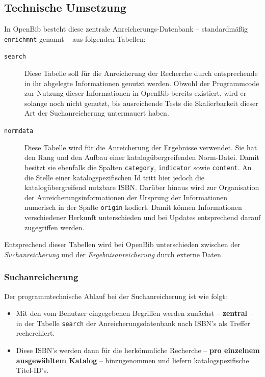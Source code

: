 \documentclass[11pt, twoside, a4paper, BCOR8mm, DIV12, bibtotoc,idxtotoc]{scrbook}
\begin{document}
\subsection{Technische Umsetzung}

In OpenBib besteht diese zentrale Anreicherungs-Datenbank --
standardmäßig \texttt{enrichmnt} genannt -- aus folgenden Tabellen:

\begin{description}
\item[\texttt{search}] Diese Tabelle soll für die Anreicherung der Recherche
  durch entsprechende in ihr abgelegte Informationen genutzt
  werden. Obwohl der Programmcode zur Nutzung dieser Informationen
  in OpenBib bereits existiert, wird er solange noch nicht genutzt,
  bis ausreichende Tests die Skalierbarkeit dieser Art der
  Suchanreicherung untermauert haben.

\item[\texttt{normdata}] Diese Tabelle wird für die Anreicherung der
  Ergebnisse verwendet. Sie hat den Rang und den Aufbau einer
  katalog\-übergreifenden Norm-Datei. Damit besitzt sie ebenfalls die
  Spalten \texttt{category}, \texttt{indicator} sowie
  \texttt{content}. An die Stelle einer katalog\-spezifischen Id tritt
  hier jedoch die katalogübergreifend nutzbare ISBN. Darüber hinaus
  wird zur Organisation der Anreicherungsinformationen der Ursprung
  der Informationen numerisch in der Spalte \texttt{origin}
  kodiert. Damit können Informationen verschiedener Herkunft
  unterschieden und bei Updates entsprechend darauf zugegriffen werden.   
\end{description}

Entsprechend dieser Tabellen wird bei OpenBib unterschieden zwischen
der \emph{Suchanreicherung} und der \emph{Ergebnisanreicherung}
durch externe Daten.

\subsubsection{Suchanreicherung}
Der programmtechnische Ablauf bei der Suchanreicherung ist wie folgt:

\begin{itemize}
\item Mit den vom Benutzer eingegebenen Begriffen werden zunächst --
  \textbf{zentral} -- in der Tabelle \texttt{search} der
  Anreicherungsdatenbank nach ISBN's als Treffer recherchiert.
\item Diese ISBN's werden dann für die herkömmliche Recherche --
  \textbf{pro einzelnem aus\-ge\-wähl\-tem Katalog} -- hinzugenommen und
  liefern katalogspezifische Titel-ID's.
\end{itemize}
\end{document}
